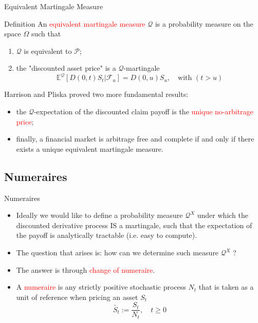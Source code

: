 \documentclass{beamer}
\begin{document}
\begin{frame}{Equivalent Martingale Measure}
  \begin{block}{Definition}
    An \textcolor{red}{equivalent martingale measure} $\mathcal{Q}$ is a probability measure on the space $\Omega$ such that
    \begin{enumerate}
    \item $\mathcal{Q}$ is equivalent to $\mathcal{P}$;
    \item the "discounted asset price" is a $\mathcal{Q}$-martingale
      \begin{equation}
	\mathbb{E}^\mathcal{Q}[D(0,t)S_t|\mathcal{F}_u] = D(0,u)S_u, \quad\text{with }(t>u)
      \end{equation}
    \end{enumerate}
  \end{block}
  \pause
  Harrison and Pliska proved two more fundamental results:
  \begin{itemize}
  \item<2-> the $\mathcal{Q}$-expectation of the discounted claim payoff is the \textcolor{red}{unique no-arbitrage price};
  \item<3-> finally, a financial market is arbitrage free and complete if and only if there exists a unique equivalent martingale measure.
  \end{itemize}
\end{frame}

\subsection{Numeraires}
\begin{frame}{Numeraires}
  \begin{itemize}
  \item<1-> Ideally we would like to define a probability measure $\mathcal{Q}^X$ under which the discounted derivative process IS a martingale, such that the expectation of the payoff is analytically tractable (i.e. easy to compute).
  \item<2-> The question that arises is: how can we determine such measure $\mathcal{Q}^X$ ?
  \item<3-> The answer is through \textcolor{red}{change of numeraire}.
  \item<4-> A \textcolor{red}{numeraire} is any strictly positive stochastic process $N_t$ that is taken as a unit of reference when pricing an asset $S_t$
    \begin{equation*}
      \tilde{S_t}:=\frac{S_t}{N_t}, \quad t \ge 0
    \end{equation*}
  \end{itemize}
\end{frame}
\end{document}
